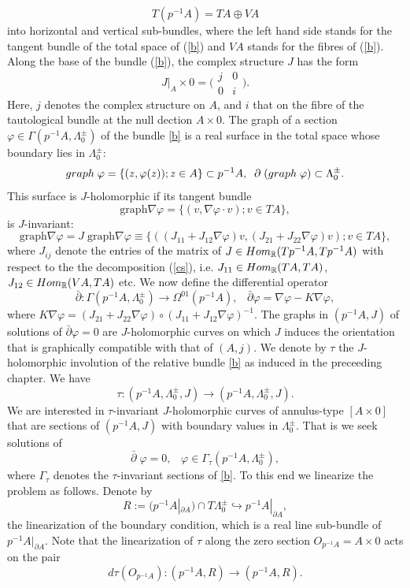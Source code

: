\documentclass[10pt,a4paper]{amsart}
\newcommand{\be}{\begin{equation}}
\newcommand{\ee}{\end{equation}}
\begin{document}
\be \label{cs}
 T (p^{-1} A) =TA \oplus VA
\ee   
into horizontal and vertical sub-bundles, where the left hand side stands for the tangent bundle of the total space of (\ref{b}) and $VA$ stands for the fibres of (\ref{b}). Along the base of the bundle (\ref{b}), the complex structure $J$ has the form 
\be \label{J0}
 J|_A \times  0=\bigg(\begin{array}{cc} j & 0\\ 0 &
i\end{array}\bigg).
\ee
Here, $j$ denotes the complex structure on $A$, and $i$ that on the fibre of the tautological bundle at the null dection $A \times  0$. The graph of a section $\varphi\in\Gamma(p^{-1}A,\Lambda_0^\pm)$  of the bundle \eqref{b} is a real surface in the total space whose boundary lies in  $\Lambda_0^\pm$:
\be
{\rm graph} \;\varphi=\{(z,\varphi(z));z \in A\} \subset p^{-1}A,\;\;
\partial\;({\rm graph}\;\varphi) \subset \Lambda_0^\pm. 
\ee
This surface is $J$-holomorphic if its tangent bundle
\[
\mbox{graph}\nabla\varphi= \{(v,\nabla\varphi\cdot v); v\in TA\},
\] 
is $J$-invariant:
\[
\mbox{graph}\nabla\varphi=J\;\mbox{graph}\nabla\varphi
\equiv \{ ((J_{11} + J_{12}\nabla \varphi)v, 
(J_{21} + J_{22}\nabla \varphi)v) ; v\in TA \},
\]
where $J_{ij}$ denote the entries of the matrix of $J \in {\rm Hom}_{\mathbb{R}}(Tp^{-1}A,Tp^{-1}A  )$ with respect to the the decomposition (\ref{cs}), i.e. $J_{11}\in {\rm Hom}_{\mathbb{R}}(TA, TA)$, $J_{12}\in {\rm Hom}_{\mathbb{R}}(VA, TA)$ etc. We now define the differential operator
\be \label{cr}
\bar{\partial}:\Gamma(p^{-1}A, \Lambda_0^{\pm} )\to\Omega^{01}(p^{-1}A),
\;\;\;\bar{\partial}\varphi=\nabla\varphi- K\nabla \varphi  ,
\ee
where  $K\nabla \varphi=(J_{21} + J_{22}\nabla \varphi)\circ (J_{11} + J_{12}\nabla \varphi)^{-1}$. The graphs in $(p^{-1}A,J) $ of solutions of $\bar{\partial} \varphi=0$ are $J$-holomorphic curves on which $J$ induces the orientation that is graphically compatible with that of $(A,j)$. We denote by $\tau$ the $J$-holomorphic involution of the relative bundle \eqref{b} as induced in the preceeding chapter. We have
\[ \tau : (p^{-1}A,\Lambda_0^{\pm}, J) \to (p^{-1}A,\Lambda_0^{\pm}, J).
\]
We are interested in $\tau$-invariant $J$-holomorphic curves of annulus-type $[A \times 0]$ that are sections of $(p^{-1}A,J)$ with boundary values in $\Lambda_0^{\pm}$. That is we seek solutions of
\be \label{cr0}
\bar{\partial}\;\varphi=0,  \;\;\;
\varphi \in \Gamma_\tau(p^{-1}A, \Lambda_0^{\pm}),
\ee
where $\Gamma_\tau$ denotes the $\tau$-invariant sections of \eqref{b}. To this end we linearize the problem as follows. Denote by 
\[
R:= (p^{-1}A|_{\partial A})\cap T\Lambda_0^{\pm}\hookrightarrow p^{-1}A|_{\partial A},
\]
the linearization of the boundary condition, which is a real line sub-bundle of $p^{-1}A|_{\partial A}$. Note that the linearization of $\tau$ along the zero section 
$ O_{p^{-1}A} = A \times 0$ acts on the pair 
\be\label{bdry}
d\tau(O_{p^{-1}A}): (p^{-1}A,R) \to (p^{-1}A,R).
\ee 
\end{document}
